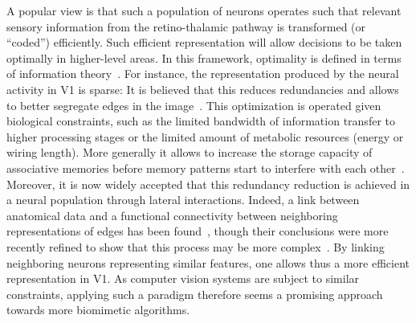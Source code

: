 \documentclass[a4paper, 11pt]{book}
\begin{document}
A popular view is that such a population of neurons operates
such that relevant sensory information from the retino-thalamic pathway
is transformed (or ``coded'') efficiently.
Such efficient representation will allow decisions
to be taken optimally in higher-level areas.
In this framework, optimality is defined in terms of information theory~\citep{Attneave54,Atick92,Wolfe10}.
For instance, the representation produced by the neural activity in V1 is sparse:
It is believed that this reduces redundancies
and allows to better segregate edges in the image~\citep{Field94,Froudarakis14}.
This optimization is operated given biological constraints,
such as the limited bandwidth of information transfer to higher processing stages
or the limited amount of metabolic resources (energy or wiring length).
More generally it allows to increase the storage capacity of associative memories
before memory patterns start to interfere with each other~\citep{Palm13}.
Moreover, it is now widely accepted that this redundancy reduction
is achieved in a neural population through lateral interactions.
Indeed, a link between anatomical data and a functional connectivity
between neighboring representations of edges has been found~\citep{Bosking97},
though their conclusions were more recently refined to show that this process may be more complex~\citep{Hunt11}.
By linking neighboring neurons representing similar features, one allows thus a more efficient representation in V1.
As computer vision systems are subject to similar constraints,
applying such a paradigm therefore seems a promising approach towards more biomimetic algorithms.
\end{document}
